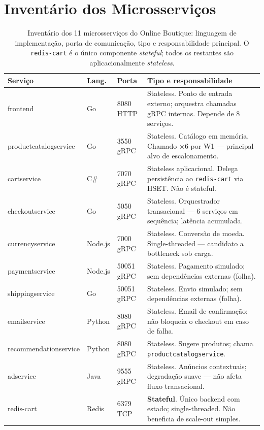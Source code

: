 \documentclass[manuscript,screen,review]{acmart}
\begin{document}
\appendix

\section{Inventário dos Microsserviços}
\label{apx:inventario}

\begin{table}[t]
\caption{Inventário dos 11 microsserviços do Online Boutique: linguagem de implementação, porta de comunicação, tipo e responsabilidade principal. O \texttt{redis-cart} é o único componente \textit{stateful}; todos os restantes são aplicacionalmente \textit{stateless}.}
\label{tab:inventario}
\begin{tabularx}{\columnwidth}{p{2.5cm}p{1.1cm}p{1.8cm}X}
\toprule
\textbf{Serviço} & \textbf{Lang.} & \textbf{Porta} & \textbf{Tipo e responsabilidade} \\
\midrule
frontend              & Go      & 8080 HTTP      & Stateless. Ponto de entrada externo; orquestra chamadas gRPC internas. Depende de 8 serviços. \\
productcatalogservice & Go      & 3550 gRPC      & Stateless. Catálogo em memória. Chamado ×6 por W1 — principal alvo de escalonamento. \\
cartservice           & C\#     & 7070 gRPC      & Stateless aplicacional. Delega persistência ao \texttt{redis-cart} via HSET. Não é stateful. \\
checkoutservice       & Go      & 5050 gRPC      & Stateless. Orquestrador transacional — 6 serviços em sequência; latência acumulada. \\
currencyservice       & Node.js & 7000 gRPC      & Stateless. Conversão de moeda. Single-threaded — candidato a bottleneck sob carga. \\
paymentservice        & Node.js & 50051 gRPC     & Stateless. Pagamento simulado; sem dependências externas (folha). \\
shippingservice       & Go      & 50051 gRPC     & Stateless. Envio simulado; sem dependências externas (folha). \\
emailservice          & Python  & 8080 gRPC      & Stateless. Email de confirmação; não bloqueia o checkout em caso de falha. \\
recommendationservice & Python  & 8080 gRPC      & Stateless. Sugere produtos; chama \texttt{productcatalogservice}. \\
adservice             & Java    & 9555 gRPC      & Stateless. Anúncios contextuais; degradação suave — não afeta fluxo transacional. \\
redis-cart            & Redis   & 6379 TCP       & \textbf{Stateful}. Único backend com estado; single-threaded. Não beneficia de scale-out simples. \\
\bottomrule
\end{tabularx}
\end{table}
\end{document}
